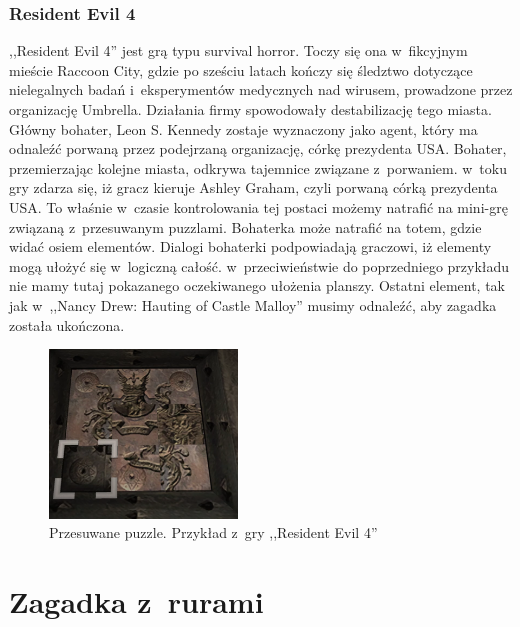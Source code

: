 \documentclass[oneside,polski,logo]{amuthesis}
\begin{document}
\subsubsection{Resident Evil 4}
\par ,,Resident Evil 4'' jest grą typu survival horror. Toczy się ona w~fikcyjnym mieście Raccoon City, gdzie po sześciu latach kończy się śledztwo dotyczące nielegalnych badań i~eksperymentów medycznych nad wirusem, prowadzone przez organizację Umbrella. Działania firmy spowodowały destabilizację tego miasta. Główny bohater, Leon S. Kennedy zostaje wyznaczony jako agent, który ma odnaleźć porwaną przez podejrzaną organizację, córkę prezydenta USA. Bohater, przemierzając kolejne miasta, odkrywa tajemnice związane z~porwaniem. w~toku gry zdarza się, iż gracz kieruje Ashley Graham, czyli porwaną córką prezydenta USA. To właśnie w~czasie kontrolowania tej postaci możemy natrafić na mini-grę związaną z~przesuwanym puzzlami. Bohaterka może natrafić na totem, gdzie widać osiem elementów. Dialogi bohaterki podpowiadają graczowi, iż elementy mogą ułożyć się w~logiczną całość. w~przeciwieństwie do poprzedniego przykładu nie mamy tutaj pokazanego oczekiwanego ułożenia planszy. Ostatni element, tak jak w~,,Nancy Drew: Hauting of Castle Malloy'' musimy odnaleźć, aby zagadka została ukończona.

\begin{figure}[h]
	\centering
	\includegraphics[width=5cm]{images/tyrek/re4.png}
	\caption{Przesuwane puzzle. Przykład z~gry ,,Resident Evil 4''}
\end{figure}


\section{Zagadka z~rurami}
\end{document}
